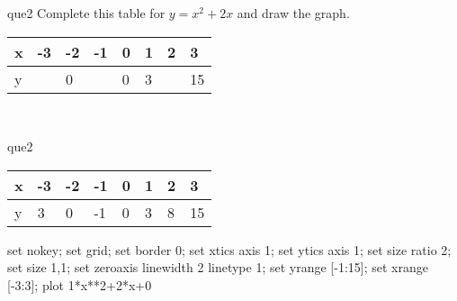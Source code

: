 \documentclass[13.5pt, varwidth=true]{beamer}
\begin{document}
\begin{frame}[shrink=19,fragile]
	\begin{beamercolorbox}[rounded=true, left, shadow=true,wd=14.8cm]{que2}
		 Complete this table for $y = x^{2} + 2x$ and draw the graph. \\[0.3cm] \renewcommand{\arraystretch}{1.2}\begin{tabular}{|C|C|C|C|C|C|C|C|} \hline x & -3 & -2 & -1 & 0 & 1 & 2 & 3 \\ \hline y &  & 0 &  & 0 & 3 &  & 15\\ \hline \end{tabular}\\[0.3cm]
	\end{beamercolorbox}
\end{frame}
\begin{frame}[shrink=19,fragile]
	\begin{beamercolorbox}[rounded=true, left, shadow=true,wd=14.8cm]{que2}
		\renewcommand{\arraystretch}{1.2}\begin{tabular}{|C|C|C|C|C|C|C|C|} \hline x & -3 & -2 & -1 & 0 & 1 & 2 & 3 \\ \hline y & 3 & 0 & -1 & 0 & 3 & 8 & 15\\ \hline \end{tabular}\begin{gnuplot}[terminal=pdf] set nokey; set grid; set border 0; set xtics axis 1; set ytics axis 1; set size ratio 2; set size 1,1; set zeroaxis linewidth 2 linetype 1; set yrange [-1:15]; set xrange [-3:3]; plot 1*x**2+2*x+0 \end{gnuplot}
	\end{beamercolorbox}
\end{frame}
\end{document}
